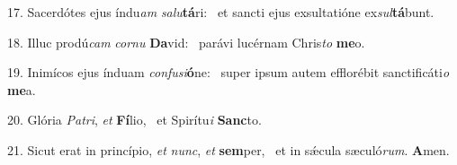 17. Sacerdótes ejus índu\textit{am} \textit{sa}\textit{lu}\textbf{tá}ri: \ast\  et sancti ejus exsultatióne ex\textit{sul}\textbf{tá}bunt.\

18. Illuc prodú\textit{cam} \textit{cor}\textit{nu} \textbf{Da}vid: \ast\  parávi lucérnam Chris\textit{to} \textbf{me}o.\

19. Inimícos ejus índuam \textit{con}\textit{fu}\textit{si}\textbf{ó}ne: \ast\  super ipsum autem efflorébit sanctificáti\textit{o} \textbf{me}a.\

20. Glória \textit{Pa}\textit{tri}, \textit{et} \textbf{Fí}lio, \ast\  et Spirítu\textit{i} \textbf{Sanc}to.\

21. Sicut erat in princípio, \textit{et} \textit{nunc}, \textit{et} \textbf{sem}per, \ast\  et in sǽcula sæculó\textit{rum}. \textbf{A}men.\

